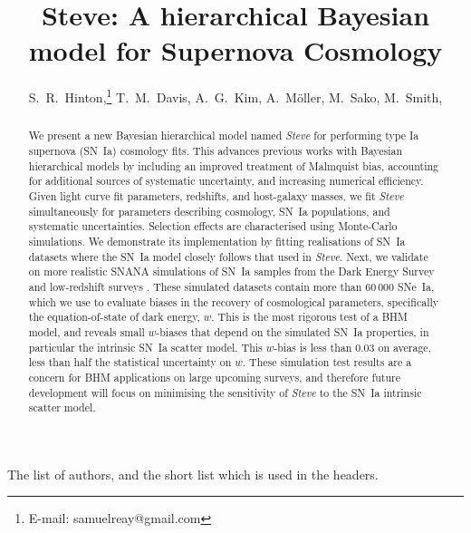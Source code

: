 \documentclass[a4paper,fleqn,usenatbib]{emulateapj}
\newcommand{\name}{Steve}
\newcommand{\steve}{\textit{Steve}}
\begin{document}
\title{\name: A hierarchical Bayesian model for Supernova Cosmology}



 The list of authors, and the short list which is used in the headers.
 \author{
 	S.~R.~Hinton,\thanks{E-mail: samuelreay@gmail.com}
 	T.~M.~Davis,
 	A.~G.~Kim,
 	A.~M\"oller,
 	M.~Sako,
 	M.~Smith,
 	\\}







\begin{abstract}
We present a new Bayesian hierarchical model named {\steve} for performing type Ia supernova (SN~Ia) cosmology fits. 
%
This advances previous works with Bayesian hierarchical models by including 
an improved treatment of Malmquist bias, 
accounting for additional sources of systematic uncertainty, 
and increasing numerical efficiency. 
%
Given light curve fit parameters, redshifts, and host-galaxy masses, we fit {\steve} simultaneously for parameters describing cosmology, SN~Ia populations, and systematic uncertainties. Selection effects are characterised using Monte-Carlo simulations.
%
We demonstrate its implementation by fitting realisations of SN~Ia datasets where the SN~Ia model closely follows that used in {\steve}.
%
Next, we validate on more realistic SNANA simulations of SN~Ia samples from the Dark Energy Survey and low-redshift surveys \citep{DESKEY}.
%
These simulated datasets contain more than $60\,000$ SNe~Ia, which we use to evaluate biases in the recovery of cosmological parameters, specifically the equation-of-state of dark energy, $w$. 
%
This is the most rigorous test of a BHM model, and reveals small $w$-biases that depend on the simulated SN~Ia properties, in particular the intrinsic SN~Ia scatter model. This $w$-bias is less than $0.03$ on average, less than half the statistical uncertainty on $w$.
%
These simulation test results are a concern for BHM applications on large upcoming surveys, and therefore future development will focus on minimising the sensitivity of {\steve} to the SN~Ia intrinsic scatter model.
\end{abstract}
\end{document}
